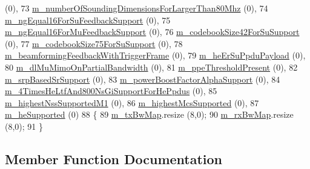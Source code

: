 \begin{DoxyCode}
       (0),
73     \hyperlink{classns3_1_1HeCapabilities_adc37633e6922c3260546c0fd91998873}{m\_numberOfSoundingDimensionsForLargerThan80Mhz} (0),
74     \hyperlink{classns3_1_1HeCapabilities_a89285fdd2f026cb824f43506cfc3c88e}{m\_ngEqual16ForSuFeedbackSupport} (0),
75     \hyperlink{classns3_1_1HeCapabilities_a8c25e39d6fdc4bf46195a8a3ac792e39}{m\_ngEqual16ForMuFeedbackSupport} (0),
76     \hyperlink{classns3_1_1HeCapabilities_a6813b518a042be5630eca7176ef38edc}{m\_codebookSize42ForSuSupport} (0),
77     \hyperlink{classns3_1_1HeCapabilities_ad20d30c4b5e5916a9d5ddc1dd9974ab3}{m\_codebookSize75ForSuSupport} (0),
78     \hyperlink{classns3_1_1HeCapabilities_a67342083f99cbe908d4bc37499f07830}{m\_beamformingFeedbackWithTriggerFrame} (0),
79     \hyperlink{classns3_1_1HeCapabilities_a10a1a090e7132b4e1e9eb2977ced7cfa}{m\_heErSuPpduPayload} (0),
80     \hyperlink{classns3_1_1HeCapabilities_aac23f94dbf47c9c855089ebbef9637e3}{m\_dlMuMimoOnPartialBandwidth} (0),
81     \hyperlink{classns3_1_1HeCapabilities_ab1fa615dfa8a62f7080232e58dbde1c0}{m\_ppeThresholdPresent} (0),
82     \hyperlink{classns3_1_1HeCapabilities_a2abcfc2454d3507833dcef612610b48b}{m\_srpBasedSrSupport} (0),
83     \hyperlink{classns3_1_1HeCapabilities_ab121dcfc4c94858e252398cc7a060827}{m\_powerBoostFactorAlphaSupport} (0),
84     \hyperlink{classns3_1_1HeCapabilities_aaf569f297a059a329925c6789f2b1266}{m\_4TimesHeLtfAnd800NsGiSupportForHePpdus} (0),
85     \hyperlink{classns3_1_1HeCapabilities_ae57448a35564e5ca6ef6a61be6417af0}{m\_highestNssSupportedM1} (0),
86     \hyperlink{classns3_1_1HeCapabilities_a85706b05f4879ec9a9343aaa00137a9e}{m\_highestMcsSupported} (0),
87     \hyperlink{classns3_1_1HeCapabilities_aa17d6ec2845446ce11fffbbf5db024a7}{m\_heSupported} (0)
88 \{
89   \hyperlink{classns3_1_1HeCapabilities_ad6af160216c8873823a05b0961bd3300}{m\_txBwMap}.resize (8,0);
90   \hyperlink{classns3_1_1HeCapabilities_a59be329f6c16d697e891f1fabc51e37f}{m\_rxBwMap}.resize (8,0);
91 \}
\end{DoxyCode}


\subsection{Member Function Documentation}
